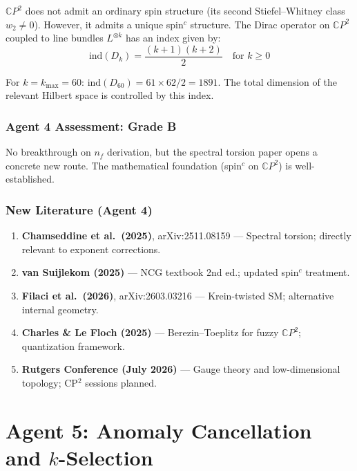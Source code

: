 \documentclass[11pt,a4paper]{article}
\newcommand{\CP}{\mathbb{C}P}
\begin{document}
$\CP^2$ does not admit an ordinary spin structure (its second Stiefel--Whitney class $w_2 \neq 0$). However, it admits a unique spin$^c$ structure. The Dirac operator on $\CP^2$ coupled to line bundles $L^{\otimes k}$ has an index given by:
\begin{equation}
\text{ind}(D_k) = \frac{(k+1)(k+2)}{2} \quad \text{for } k \geq 0
\end{equation}

For $k = k_{\max} = 60$: $\text{ind}(D_{60}) = 61 \times 62 / 2 = 1891$. The total dimension of the relevant Hilbert space is controlled by this index.

\section{Agent 4 Assessment: Grade B}

No breakthrough on $n_f$ derivation, but the spectral torsion paper opens a concrete new route. The mathematical foundation (spin$^c$ on $\CP^2$) is well-established.

\section{New Literature (Agent 4)}

\begin{enumerate}
\item \textbf{Chamseddine et al.\ (2025)}, arXiv:2511.08159 --- Spectral torsion; directly relevant to exponent corrections.
\item \textbf{van Suijlekom (2025)} --- NCG textbook 2nd ed.; updated spin$^c$ treatment.
\item \textbf{Filaci et al.\ (2026)}, arXiv:2603.03216 --- Krein-twisted SM; alternative internal geometry.
\item \textbf{Charles \& Le Floch (2025)} --- Berezin--Toeplitz for fuzzy $\CP^2$; quantization framework.
\item \textbf{Rutgers Conference (July 2026)} --- Gauge theory and low-dimensional topology; CP$^2$ sessions planned.
\end{enumerate}


\part{Agent 5: Anomaly Cancellation and $k$-Selection}
\label{part:agent5}
\end{document}
